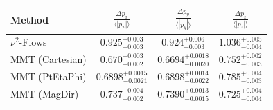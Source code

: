     \begin{tabular}{lccc}
        \toprule
        Method & $\frac{\Delta p_x}{\langle |p_x|\rangle}$ & $\frac{\Delta p_y}{\langle |p_y|\rangle}$ & $\frac{\Delta p_z}{\langle |p_z|\rangle}$ \\
        \midrule
        $\nu^2$-Flows & $0.925^{+0.003}_{-0.003}$ & $0.924^{+0.006}_{-0.003}$ & $1.036^{+0.005}_{-0.004}$ \\
        MMT (Cartesian) & $0.670^{+0.003}_{-0.002}$ & $0.6694^{+0.0018}_{-0.0020}$ & $0.752^{+0.002}_{-0.003}$ \\
        MMT (PtEtaPhi) & $0.6898^{+0.0015}_{-0.0021}$ & $0.6898^{+0.0014}_{-0.0022}$ & $0.785^{+0.004}_{-0.003}$ \\
        MMT (MagDir) & $0.737^{+0.004}_{-0.002}$ & $0.7390^{+0.0013}_{-0.0015}$ & $0.725^{+0.004}_{-0.004}$ \\
        \bottomrule
    \end{tabular}
